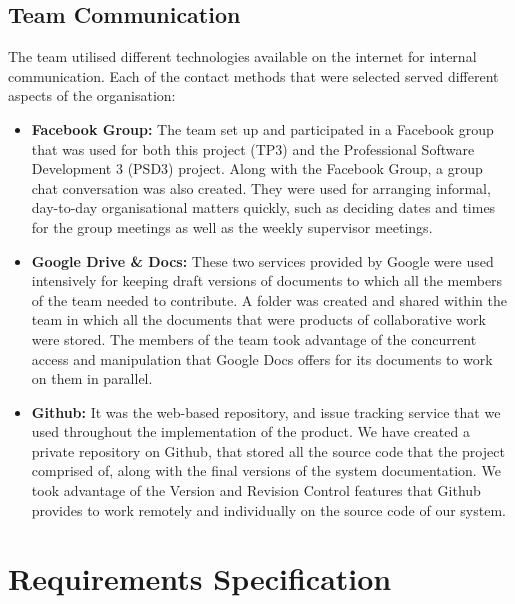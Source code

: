 \documentclass{l3proj}
\begin{document}
\section{Team Communication}
\par
The team utilised different technologies available on the internet for internal communication. Each of the contact methods that were selected served different aspects of the organisation:
\begin{itemize}
\item \textbf{Facebook Group:} The team set up and participated in a Facebook group that was used for both this project (TP3) and the Professional Software Development 3 (PSD3) project. Along with the Facebook Group, a group chat conversation was also created. They were used for arranging informal, day-to-day organisational matters quickly, such as deciding dates and times for the group meetings as well as the weekly supervisor meetings.
\item \textbf{Google Drive \& Docs:} These two services provided by Google were used intensively for keeping draft versions of documents to which all the members of the team needed to contribute. A folder was created and shared within the team in which all the documents that were products of collaborative work were stored. The members of the team took advantage of the concurrent access and manipulation that Google Docs offers for its documents to work on them in parallel.
\item \textbf{Github:} It was the web-based repository, and issue tracking service that we used throughout the implementation of the product. We have created a private repository on Github, that stored all the source code that the project comprised of, along with the final versions of the system documentation. We took advantage of the Version and Revision Control features that Github provides to work remotely and individually on the source code of our system.

\end{itemize}
\chapter{Requirements Specification}
\label{requirementsspecification}

\end{document}
